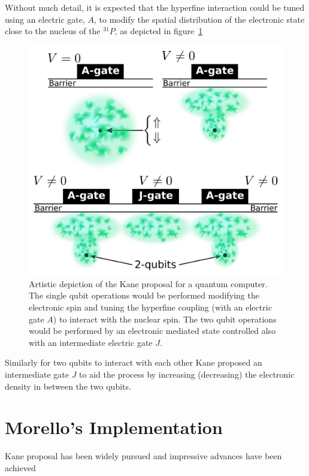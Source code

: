 Without much detail, it is expected that the hyperfine interaction could be tuned using an electric gate, $A$, to modify the spatial distribution of the electronic state close to the nucleus of the $^{31}P$, as depicted in figure~\ref{kane}
\begin{figure}[h!]
\centering
\includegraphics{chapter03/figures/kane.pdf}
\vspace{-5pt}
\caption{Artistic depiction of the Kane proposal for a quantum computer. The single qubit operations would be performed modifying the electronic spin and tuning the hyperfine coupling (with an electric gate $A$) to interact with the nuclear spin. The two qubit operations would be performed by an electronic mediated state controlled also with an intermediate electric gate $J$.}
\label{kane}
\end{figure}
\FloatBarrier
Similarly for two qubits to interact with each other Kane proposed an intermediate gate $J$ to aid the process by increasing (decreasing) the electronic density in between the two qubits.


\section{Morello's Implementation}
Kane proposal has been widely pursued and impressive advances have been achieved



